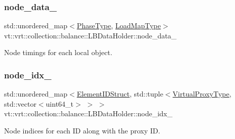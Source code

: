 \subsubsection{\texorpdfstring{node\+\_\+data\+\_\+}{node\_data\_}}
{\footnotesize\ttfamily std\+::unordered\+\_\+map$<$\hyperlink{namespacevt_a46ce6733d5cdbd735d561b7b4029f6d7}{Phase\+Type}, \hyperlink{namespacevt_1_1vrt_1_1collection_1_1balance_a5339303db2e1ce964d783a53fd74e6b1}{Load\+Map\+Type}$>$ vt\+::vrt\+::collection\+::balance\+::\+L\+B\+Data\+Holder\+::node\+\_\+data\+\_\+}



Node timings for each local object. 

\mbox{\label{structvt_1_1vrt_1_1collection_1_1balance_1_1_l_b_data_holder_a6b316a4e35ea98e592cbe875074aa6d8}} 
\subsubsection{\texorpdfstring{node\+\_\+idx\+\_\+}{node\_idx\_}}
{\footnotesize\ttfamily std\+::unordered\+\_\+map$<$\hyperlink{namespacevt_1_1vrt_1_1collection_1_1balance_a9f5b53fafb270212279a4757d2c4cd28}{Element\+I\+D\+Struct}, std\+::tuple$<$\hyperlink{namespacevt_a1b417dd5d684f045bb58a0ede70045ac}{Virtual\+Proxy\+Type}, std\+::vector$<$uint64\+\_\+t$>$ $>$ $>$ vt\+::vrt\+::collection\+::balance\+::\+L\+B\+Data\+Holder\+::node\+\_\+idx\+\_\+}



Node indices for each ID along with the proxy ID. 

\mbox{\label{structvt_1_1vrt_1_1collection_1_1balance_1_1_l_b_data_holder_ab862d2f1b884256fc88634757f37bb80}} 
